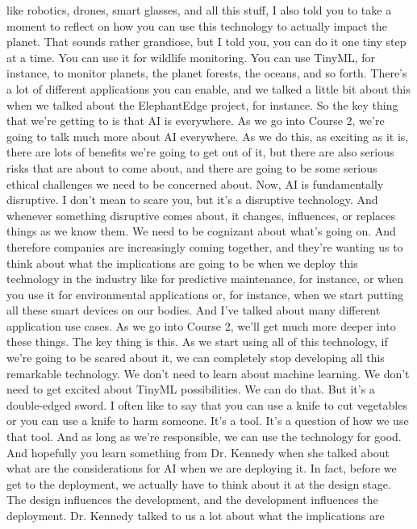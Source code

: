 like robotics, drones, smart glasses, and all this stuff,
I also told you to take a moment to reflect
on how you can use this technology to actually impact the planet.
That sounds rather grandiose, but I told you,
you can do it one tiny step at a time.
You can use it for wildlife monitoring.
You can use TinyML, for instance, to monitor planets, the planet
forests, the oceans, and so forth.
There's a lot of different applications you can enable,
and we talked a little bit about this when we talked about the ElephantEdge
project, for instance.
So the key thing that we're getting to is that AI is everywhere.
As we go into Course 2, we're going to talk much more about AI everywhere.
As we do this, as exciting as it is, there
are lots of benefits we're going to get out of it,
but there are also serious risks that are about to come about,
and there are going to be some serious ethical challenges we
need to be concerned about.
Now, AI is fundamentally disruptive.
I don't mean to scare you, but it's a disruptive technology.
And whenever something disruptive comes about,
it changes, influences, or replaces things as we know them.
We need to be cognizant about what's going on.
And therefore companies are increasingly coming together,
and they're wanting us to think about what the implications are going
to be when we deploy this technology in the industry
like for predictive maintenance, for instance,
or when you use it for environmental applications
or, for instance, when we start putting all these smart devices on our bodies.
And I've talked about many different application use cases.
As we go into Course 2, we'll get much more deeper into these things.
The key thing is this.
As we start using all of this technology,
if we're going to be scared about it, we can completely
stop developing all this remarkable technology.
We don't need to learn about machine learning.
We don't need to get excited about TinyML possibilities.
We can do that.
But it's a double-edged sword.
I often like to say that you can use a knife to cut vegetables
or you can use a knife to harm someone.
It's a tool.
It's a question of how we use that tool.
And as long as we're responsible, we can use the technology for good.
And hopefully you learn something from Dr. Kennedy
when she talked about what are the considerations for AI when
we are deploying it.
In fact, before we get to the deployment,
we actually have to think about it at the design stage.
The design influences the development, and the development
influences the deployment.
Dr. Kennedy talked to us a lot about what the implications are
